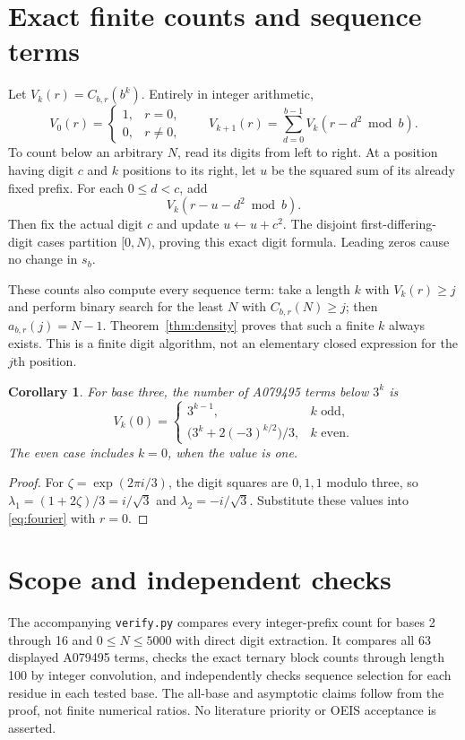 \documentclass[10pt]{article}
\newtheorem{corollary}{Corollary}
\begin{document}
\section{Exact finite counts and sequence terms}
Let $V_k(r)=C_{b,r}(b^k)$. Entirely in integer arithmetic,
\begin{equation}\label{eq:dp}
 V_0(r)=\begin{cases}1,&r=0,\\0,&r\ne0,\end{cases}
 \qquad
 V_{k+1}(r)=\sum_{d=0}^{b-1}V_k(r-d^2\bmod b).
\end{equation}
To count below an arbitrary $N$, read its digits from left to right.
At a position having digit $c$ and $k$ positions to its right,
let $u$ be the squared sum of its already fixed prefix. For each
$0\le d<c$, add
\[
 V_k(r-u-d^2\bmod b).
\]
Then fix the actual digit $c$ and update $u\leftarrow u+c^2$.
The disjoint first-differing-digit cases partition $[0,N)$, proving
this exact digit formula. Leading zeros cause no change in $s_b$.

These counts also compute every sequence term: take a length $k$
with $V_k(r)\ge j$ and perform binary search for the least $N$
with $C_{b,r}(N)\ge j$; then $a_{b,r}(j)=N-1$.
Theorem~\ref{thm:density} proves that such a finite $k$ always
exists. This is a finite digit algorithm, not an elementary closed
expression for the $j$th position.

\begin{corollary}
For base three, the number of A079495 terms below $3^k$ is
\[
 V_k(0)=
 \begin{cases}
  3^{k-1},&k\text{ odd},\\[2pt]
  \bigl(3^k+2(-3)^{k/2}\bigr)/3,&k\text{ even}.
 \end{cases}
\]
The even case includes $k=0$, when the value is one.
\end{corollary}
\begin{proof}
For $\zeta=\exp(2\pi i/3)$, the digit squares are $0,1,1$
modulo three, so $\lambda_1=(1+2\zeta)/3=i/\sqrt3$ and
$\lambda_2=-i/\sqrt3$. Substitute these values into
\eqref{eq:fourier} with $r=0$.
\end{proof}

\section{Scope and independent checks}
The accompanying \texttt{verify.py} compares every integer-prefix
count for bases 2 through 16 and $0\le N\le5000$ with direct
digit extraction. It compares all 63 displayed A079495 terms,
checks the exact ternary block counts through length 100 by
integer convolution, and independently checks sequence selection
for each residue in each tested base. The all-base and asymptotic
claims follow from the proof, not finite numerical ratios.
No literature priority or OEIS acceptance is asserted.
\end{document}
